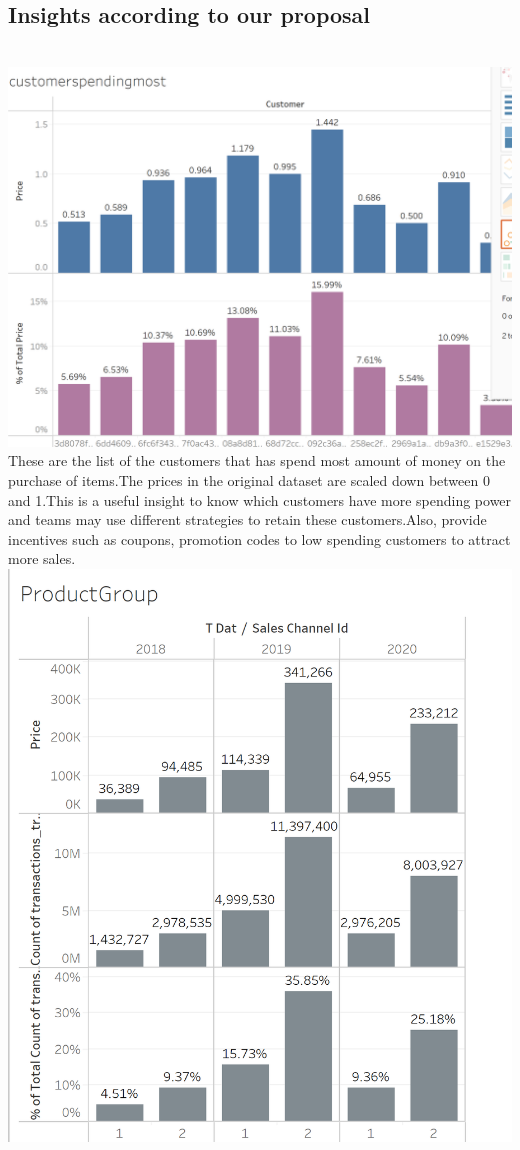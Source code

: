 \documentclass[11pt,journal,compsoc]{IEEEtran}
\begin{document}
\subsection{Insights according to our proposal} \\
\includegraphics[scale=0.35]{images/customer.png} \\
These are the list of the customers that has spend most amount of money on the purchase of items.The prices in the original dataset are scaled down between 0 and 1.This is a useful insight to know which customers have more spending power and teams may use different strategies to retain these customers.Also, provide incentives such as coupons, promotion codes to low spending customers to attract more sales. \\
\includegraphics[scale=0.35]{images/date.png} \\
\end{document}
